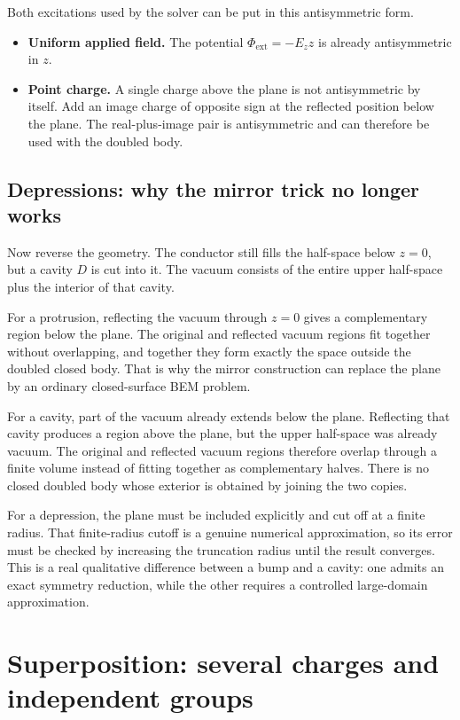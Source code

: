 \documentclass[11pt]{article}
\begin{document}
Both excitations used by the solver can be put in this antisymmetric form.

\begin{itemize}
\item \textbf{Uniform applied field.} The potential
  $\Phi_{\mathrm{ext}}=-E_z z$ is already antisymmetric in $z$.

\item \textbf{Point charge.} A single charge above the plane is not
  antisymmetric by itself.  Add an image charge of opposite sign at the
  reflected position below the plane.  The real-plus-image pair is
  antisymmetric and can therefore be used with the doubled body.
\end{itemize}

\subsection{Depressions: why the mirror trick no longer works}

Now reverse the geometry.  The conductor still fills the half-space below
$z=0$, but a cavity $D$ is cut into it.  The vacuum consists of the entire upper
half-space plus the interior of that cavity.

For a protrusion, reflecting the vacuum through $z=0$ gives a complementary
region below the plane.  The original and reflected vacuum regions fit together
without overlapping, and together they form exactly the space outside the
doubled closed body.  That is why the mirror construction can replace the plane
by an ordinary closed-surface BEM problem.

For a cavity, part of the vacuum already extends below the plane.  Reflecting
that cavity produces a region above the plane, but the upper half-space was
already vacuum.  The original and reflected vacuum regions therefore overlap
through a finite volume instead of fitting together as complementary halves.
There is no closed doubled body whose exterior is obtained by joining the two
copies.

For a depression, the plane must be included explicitly and cut off at a finite
radius.  That finite-radius cutoff is a genuine numerical approximation, so its
error must be checked by increasing the truncation radius until the result
converges.  This is a real qualitative difference between a bump and a cavity:
one admits an exact symmetry reduction, while the other requires a controlled
large-domain approximation.

\section{Superposition: several charges and independent groups}
\end{document}
